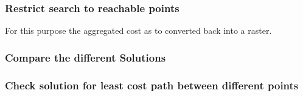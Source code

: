 \subsubsection{Restrict search to reachable points}
For this purpose the aggregated cost as to converted back into a raster.

\subsubsection{Compare the different Solutions}
\subsubsection{Check solution for least cost path between different points}